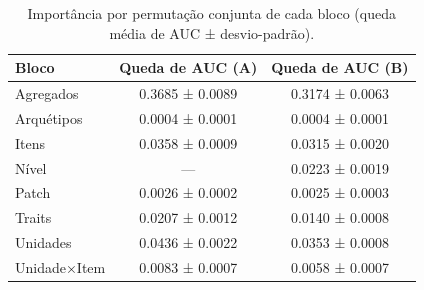 \begin{table}[htbp]
\caption{Importância por permutação conjunta de cada bloco (queda média de AUC ± desvio-padrão).}
\label{tab:permutacao}
\centering
\small
\begin{tabular}{lcc}
\toprule
Bloco & Queda de AUC (A) & Queda de AUC (B) \\
\midrule
Agregados & 0.3685 ± 0.0089 & 0.3174 ± 0.0063 \\
Arquétipos & 0.0004 ± 0.0001 & 0.0004 ± 0.0001 \\
Itens & 0.0358 ± 0.0009 & 0.0315 ± 0.0020 \\
Nível & — & 0.0223 ± 0.0019 \\
Patch & 0.0026 ± 0.0002 & 0.0025 ± 0.0003 \\
Traits & 0.0207 ± 0.0012 & 0.0140 ± 0.0008 \\
Unidades & 0.0436 ± 0.0022 & 0.0353 ± 0.0008 \\
Unidade×Item & 0.0083 ± 0.0007 & 0.0058 ± 0.0007 \\
\bottomrule
\end{tabular}
\end{table}
